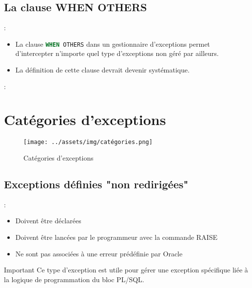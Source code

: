 \documentclass[10pt]{beamer}
\begin{document}
\subsection{La clause WHEN OTHERS}
\begin{frame}{\secname : \subsecname}
    \begin{itemize}
        \item La clause \lstinline[language=sql]!WHEN OTHERS! dans un gestionnaire d'exceptions permet d'intercepter n'importe quel type d'exceptions non géré par ailleurs.
        \item La définition de cette clause devrait devenir systématique.
    \end{itemize}
\end{frame}

\begin{frame}{\secname : \subsecname}
    
\end{frame}

\section{Catégories d'exceptions}
\tocss

\begin{frame}{\secname}
    \begin{figure}
        \begin{center}
            \texttt{[image: ../assets/img/catégories.png]}
            \caption{Catégories d'exceptions}
        \end{center}
    \end{figure}
\end{frame}

\subsection{Exceptions définies "non redirigées"}
\begin{frame}{\secname : \subsecname}
    \begin{itemize}
        \item Doivent être déclarées
        \item Doivent être lancées par le programmeur avec la commande RAISE
        \item Ne sont pas associées à une erreur prédéfinie par Oracle
    \end{itemize}
    \begin{alertblock}{Important}
        Ce type d'exception est utile pour gérer une exception spécifique liée à la logique de programmation du bloc PL/SQL.
    \end{alertblock}

\end{frame}
\end{document}
